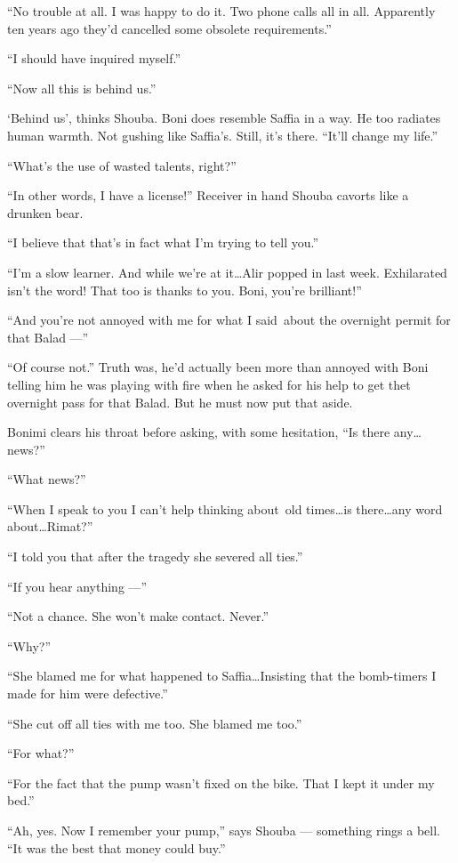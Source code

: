 \documentclass[twoside,11pt]{book}
\begin{document}
``No trouble at all. I was happy to do it. Two phone calls all in all. Apparently ten years ago
they'd cancelled some obsolete requirements.''

``I should have inquired myself.''

``Now all this is behind us.''

`Behind us', thinks Shouba. Boni does resemble Saffia in a way. He too radiates human warmth. Not gushing like
Saffia's. Still, it's there. ``It'll change my life.''

``What's the use of wasted talents, right?''

``In other words, I have a license!'' Receiver in hand Shouba cavorts like a drunken bear.

``I believe that that's in fact what I'm trying to tell you.''

``I'm a slow learner. And while we're at it{\ldots}Alir popped in last week. Exhilarated isn't the word!
That too is thanks to you. Boni, you're brilliant!''

``And you're not annoyed with me for what I said~about the overnight permit for that Balad ---''

``Of course not.'' Truth{ }was, he'd actually been more than annoyed with Boni
telling him he was playing with fire when he asked for his help to get thet overnight pass for
that{ }Balad. But he must now put that aside.

Bonimi clears his throat before asking, with some hesitation, ``Is there any{\ldots}news?''

``What news?''

``When I speak to you I can't help thinking about~old times{\ldots}is there{\ldots}any word about{\ldots}Rimat?''

``I told you that after the tragedy she severed all ties.''

``If you hear anything ---''

``Not a chance. She won't make contact. Never.''

``Why?''

``She blamed me for what happened to Saffia{\ldots}Insisting that the bomb-timers I made for him were
defective.''

``She cut off all ties with me too. She blamed me too.''

``For what?''

``For the fact that the pump wasn't fixed on the bike. That I kept it under my bed.''

``Ah, yes. Now I remember your pump,'' says Shouba --- something rings a bell. ``It was the best that money
could buy.''
\end{document}
